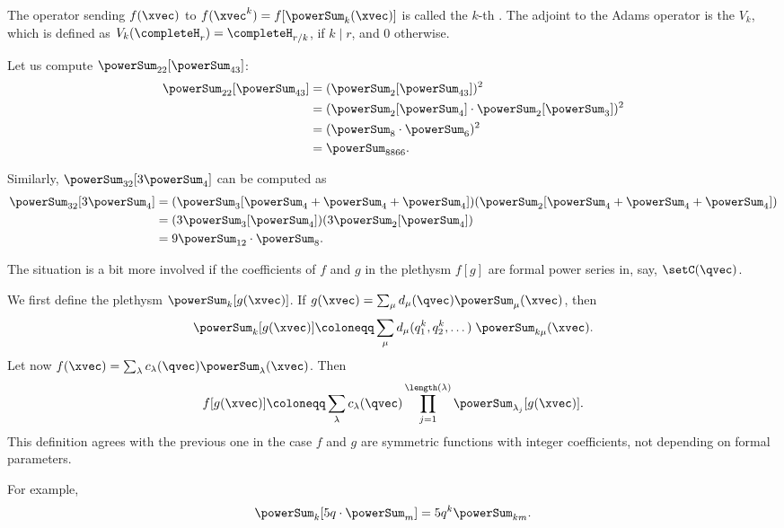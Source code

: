 The operator sending $f(\xvec)$ to
$f(\xvec^k) = f[\powerSum_k(\xvec)]$ is called the
$k$-th \label{adamsOperator}.
The adjoint to the Adams operator is the
\label{verschiebungOperator} $V_k$,
which is defined as $V_k(\completeH_r) = \completeH_{r/k}$, if $k \mid r$,
and $0$ otherwise.


\begin{example}
Let us compute $\powerSum_{22}[\powerSum_{43}]$:
\begin{align*}
\powerSum_{22}[\powerSum_{43}] &= (\powerSum_{2}[\powerSum_{43}])^2 \\
&= (\powerSum_{2}[\powerSum_{4}] \cdot \powerSum_{2}[\powerSum_{3}])^2 \\
&= (\powerSum_{8} \cdot \powerSum_{6})^2 \\
&= \powerSum_{8866}.
\end{align*}

Similarly, $\powerSum_{32}[3\powerSum_{4}]$ can be computed as
\begin{align*}
\powerSum_{32}[3\powerSum_{4}]
  &= (\powerSum_{3}[\powerSum_{4}+\powerSum_{4}+\powerSum_{4}])
     (\powerSum_{2}[\powerSum_{4}+\powerSum_{4}+\powerSum_{4}]) \\
&= (3\powerSum_{3}[\powerSum_{4}])(3\powerSum_{2}[\powerSum_{4}]) \\
&= 9\powerSum_{12} \cdot \powerSum_{8}.
\end{align*}
\end{example}


The situation is a bit more involved if the coefficients of $f$ and $g$
in the plethysm $f[g]$ are formal power series in, say, $\setC(\qvec)$.

We first define the plethysm $\powerSum_k[g(\xvec)]$.  If
$g(\xvec) = \sum_{\mu} d_\mu(\qvec) \powerSum_\mu(\xvec)$, then
\[
\powerSum_k[g(\xvec)] \coloneqq
\sum_{\mu} d_\mu(q_1^k,q_2^k,\dotsc) \; \powerSum_{k\mu}(\xvec) .
\]
Let now $f(\xvec) = \sum_{\lambda} c_\lambda(\qvec) \powerSum_\lambda(\xvec)$.
Then
\[
f[g(\xvec)] \coloneqq
\sum_{\lambda} c_\lambda(\qvec)
\prod_{j=1}^{\length(\lambda)} \powerSum_{\lambda_j}[g(\xvec)].
\]
This definition agrees with the previous one in the case $f$ and $g$ are symmetric
functions with integer coefficients, not depending on formal parameters.


\begin{example}
For example,
\[
\powerSum_{k}[5q \cdot \powerSum_{m}] = 5 q^k \powerSum_{km}.
\]
\end{example}

